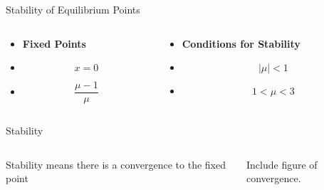 \documentclass{beamer}
\begin{document}
\begin{frame}{Stability of Equilibrium Points}
	\begin{columns}
		\begin{column}{0.5\textwidth}
			\begin{itemize}
				\item
					\textbf{Fixed Points}
				\item
					\begin{equation*}
						x=0
					\end{equation*}
				\pause
				\item
					\begin{equation*}
						\frac{\mu-1}{\mu}
					\end{equation*}
			\end{itemize}
		\end{column}
		\pause
		\begin{column}{0.5\textwidth}
			\begin{itemize}
				\item
					\textbf{Conditions for Stability}
				\item
					\begin{equation*}
						|\mu|<1
					\end{equation*}
				\pause
				\item
					\begin{equation*}
						1<\mu<3
					\end{equation*}
			\end{itemize}
		\end{column}
	\end{columns}
\end{frame}

\begin{frame}{Stability}
	\begin{columns}
		\begin{column}{0.5\textwidth}
			Stability means there is a convergence to the fixed point
		\end{column}
		\begin{column}{0.5\textwidth}
			Include figure of convergence.
		\end{column}
	\end{columns}
\end{frame}
\end{document}

